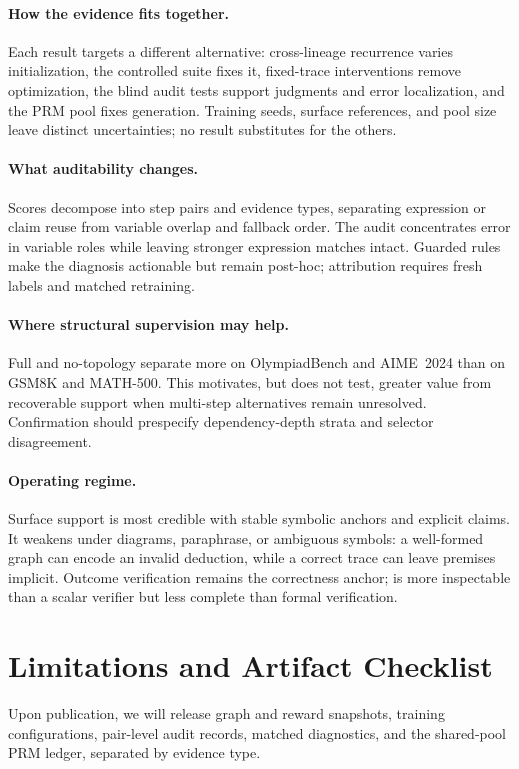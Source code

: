 \paragraph{How the evidence fits together.}
Each result targets a different alternative: cross-lineage recurrence varies initialization, the controlled suite fixes it, fixed-trace interventions remove optimization, the blind audit tests support judgments and error localization, and the PRM pool fixes generation. Training seeds, surface references, and pool size leave distinct uncertainties; no result substitutes for the others.

\paragraph{What auditability changes.}
Scores decompose into step pairs and evidence types, separating expression or claim reuse from variable overlap and fallback order. The audit concentrates error in variable roles while leaving stronger expression matches intact. Guarded rules make the diagnosis actionable but remain post-hoc; attribution requires fresh labels and matched retraining.

\paragraph{Where structural supervision may help.}
Full and no-topology separate more on OlympiadBench and AIME~2024 than on GSM8K and MATH-500. This motivates, but does not test, greater value from recoverable support when multi-step alternatives remain unresolved. Confirmation should prespecify dependency-depth strata and selector disagreement.

\paragraph{Operating regime.}
Surface support is most credible with stable symbolic anchors and explicit claims. It weakens under diagrams, paraphrase, or ambiguous symbols: a well-formed graph can encode an invalid deduction, while a correct trace can leave premises implicit. Outcome verification remains the correctness anchor; \method is more inspectable than a scalar verifier but less complete than formal verification.

\section{Limitations and Artifact Checklist}
Upon publication, we will release graph and reward snapshots, training configurations, pair-level audit records, matched diagnostics, and the shared-pool PRM ledger, separated by evidence type.

